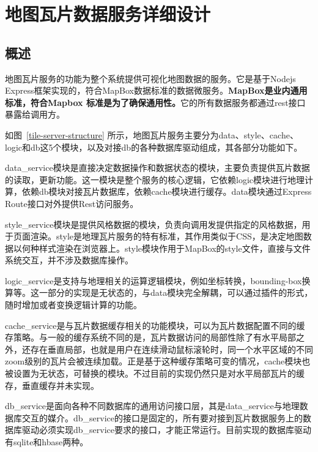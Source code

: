 \chapter{地图瓦片数据服务详细设计}
\section{概述}
地图瓦片服务的功能为整个系统提供可视化地图数据的服务。它是基于Nodejs Express框架实现的，符合MapBox数据标准的数据微服务。\textbf{MapBox是业内通用标准，符合Mapbox 标准是为了确保通用性。}它的所有数据服务都通过rest接口暴露给调用方。

如图~\ref{tile-server-structure} 所示，地图瓦片服务主要分为data、style、cache、logic和db这5个模块，以及对接db的各种数据库驱动组成，其各部分功能如下。

data\_service模块是直接决定数据操作和数据状态的模块，主要负责提供瓦片数据的读取，更新功能。这一模块是整个服务的核心逻辑，它依赖logic模块进行地理计算，依赖db模块对接瓦片数据库，依赖cache模块进行缓存。data模块通过Express Route接口对外提供Rest访问服务。

style\_service模块是提供风格数据的模块，负责向调用发提供指定的风格数据，用于页面渲染。style是地理瓦片服务的特有标准，其作用类似于CSS，是决定地图数据以何种样式渲染在浏览器上。style模块作用于MapBox的style文件，直接与文件系统交互，并不涉及数据库操作。

logic\_service是支持与地理相关的运算逻辑模块，例如坐标转换，bounding-box换算等。这一部分的实现是无状态的，与data模块完全解耦，可以通过插件的形式，随时增加或者变换逻辑计算的功能。

cache\_service是与瓦片数据缓存相关的功能模块，可以为瓦片数据配置不同的缓存策略。与一般的缓存系统不同的是，瓦片数据访问的局部性除了有水平局部之外，还存在垂直局部，也就是用户在连续滑动鼠标滚轮时，同一个水平区域的不同zoom级别的瓦片会被连续加载。正是基于这种缓存策略可变的情况，cache模块也被设置为无状态，可替换的模块。不过目前的实现仍然只是对水平局部瓦片的缓存，垂直缓存并未实现。

db\_service是面向各种不同数据库的通用访问接口层，其是data\_service与地理数据库交互的媒介。db\_service的接口是固定的，所有要对接到瓦片数据服务上的数据库驱动必须实现db\_service要求的接口，才能正常运行。目前实现的数据库驱动有sqlite和hbase两种。

